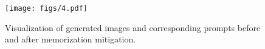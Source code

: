 \begin{figure}[!ht]
    \centering
    \texttt{[image: figs/4.pdf]}
    \vspace{-4mm}
    \caption{Visualization of generated images and corresponding prompts before and after memorization mitigation.}
    \label{fig:res2}
    \vspace{-3.4mm}
\end{figure}